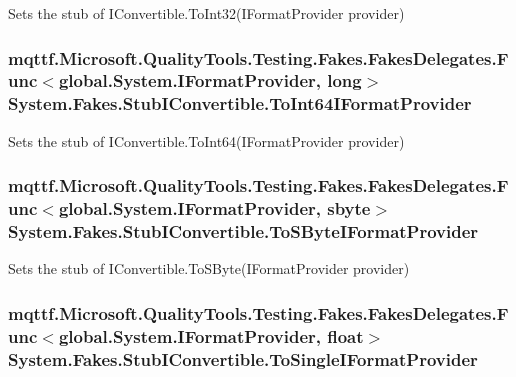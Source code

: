 Sets the stub of I\-Convertible.\-To\-Int32(\-I\-Format\-Provider provider)

\hypertarget{class_system_1_1_fakes_1_1_stub_i_convertible_a95ba310c4e89e0294776d4c5ab426b1e}{
\subsubsection[{To\-Int64\-I\-Format\-Provider}]{\setlength{\rightskip}{0pt plus 5cm}mqttf.\-Microsoft.\-Quality\-Tools.\-Testing.\-Fakes.\-Fakes\-Delegates.\-Func$<$global.\-System.\-I\-Format\-Provider, long$>$ System.\-Fakes.\-Stub\-I\-Convertible.\-To\-Int64\-I\-Format\-Provider}}\label{class_system_1_1_fakes_1_1_stub_i_convertible_a95ba310c4e89e0294776d4c5ab426b1e}


Sets the stub of I\-Convertible.\-To\-Int64(\-I\-Format\-Provider provider)

\hypertarget{class_system_1_1_fakes_1_1_stub_i_convertible_a7daf855c7a5132e7c5aae542b00b6d6a}{
\subsubsection[{To\-S\-Byte\-I\-Format\-Provider}]{\setlength{\rightskip}{0pt plus 5cm}mqttf.\-Microsoft.\-Quality\-Tools.\-Testing.\-Fakes.\-Fakes\-Delegates.\-Func$<$global.\-System.\-I\-Format\-Provider, sbyte$>$ System.\-Fakes.\-Stub\-I\-Convertible.\-To\-S\-Byte\-I\-Format\-Provider}}\label{class_system_1_1_fakes_1_1_stub_i_convertible_a7daf855c7a5132e7c5aae542b00b6d6a}


Sets the stub of I\-Convertible.\-To\-S\-Byte(\-I\-Format\-Provider provider)

\hypertarget{class_system_1_1_fakes_1_1_stub_i_convertible_a64c3bf225ef4de15456b02dcb28125b9}{
\subsubsection[{To\-Single\-I\-Format\-Provider}]{\setlength{\rightskip}{0pt plus 5cm}mqttf.\-Microsoft.\-Quality\-Tools.\-Testing.\-Fakes.\-Fakes\-Delegates.\-Func$<$global.\-System.\-I\-Format\-Provider, float$>$ System.\-Fakes.\-Stub\-I\-Convertible.\-To\-Single\-I\-Format\-Provider}}\label{class_system_1_1_fakes_1_1_stub_i_convertible_a64c3bf225ef4de15456b02dcb28125b9}


